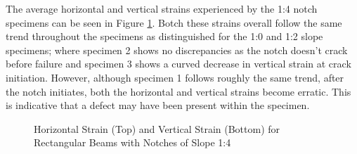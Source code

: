 \documentclass[11pt,a4paper]{article}
\numberwithin{equation}{subsection}
\begin{document}
\pagebreak

\noindent
The average horizontal and vertical strains experienced by the 1:4 notch specimens can be seen in Figure \ref{fig:Rect_14_Z_Y}. Botch these strains overall follow the same trend throughout the specimens as distinguished for the 1:0 and 1:2 slope specimens; where specimen 2 shows no discrepancies as the notch doesn't crack before failure and specimen 3 shows a curved decrease in vertical strain at crack initiation. However, although specimen 1 follows roughly the same trend, after the notch initiates, both the horizontal and vertical strains become erratic. This is indicative that a defect may have been present within the specimen.

\pagebreak

\begin{figure}[h]
	\begin{center}
	\end{center}
	\caption{Horizontal Strain (Top) and Vertical Strain (Bottom) for Rectangular Beams with Notches of Slope 1:4}
	\label{fig:Rect_14_Z_Y}
\end{figure}
\end{document}
